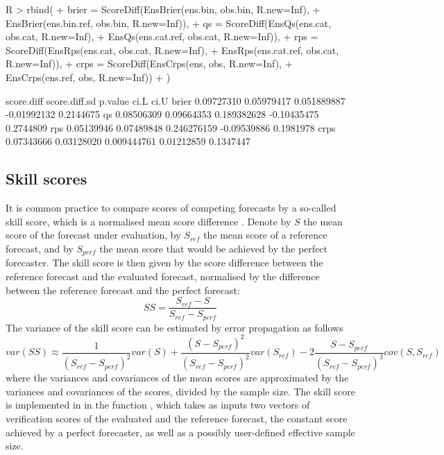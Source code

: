 \documentclass[article]{jss}
\begin{document}
\begin{Schunk}
\begin{Sinput}
R > rbind(
+   brier = ScoreDiff(EnsBrier(ens.bin,     obs.bin, R.new=Inf), 
+                     EnsBrier(ens.bin.ref, obs.bin, R.new=Inf)),
+   qs    = ScoreDiff(EnsQs(ens.cat,     obs.cat, R.new=Inf), 
+                     EnsQs(ens.cat.ref, obs.cat, R.new=Inf)),
+   rps   = ScoreDiff(EnsRps(ens.cat,     obs.cat, R.new=Inf), 
+                     EnsRps(ens.cat.ref, obs.cat, R.new=Inf)),
+   crps  = ScoreDiff(EnsCrps(ens,     obs, R.new=Inf),  
+                     EnsCrps(ens.ref, obs, R.new=Inf))
+ )
\end{Sinput}
\begin{Soutput}
      score.diff score.diff.sd     p.value        ci.L      ci.U
brier 0.09727310    0.05979417 0.051889887 -0.01992132 0.2144675
qs    0.08506309    0.09664353 0.189382628 -0.10435475 0.2744809
rps   0.05139946    0.07489848 0.246276159 -0.09539886 0.1981978
crps  0.07343666    0.03128020 0.009444761  0.01212859 0.1347447
\end{Soutput}
\end{Schunk}


\subsection{Skill scores}

It is common practice to compare scores of competing forecasts by a so-called skill score, which is a normalised mean score difference \citep{wilks2011statistical}.
Denote by $S$ the mean score of the forecast under evaluation, by $S_{ref}$ the mean score of a reference forecast, and by $S_{perf}$ the mean score that would be achieved by the perfect forecaster.
The skill score is then given by the score difference between the reference forecast and the evaluated forecast, normalised by the difference between the reference forecast and the perfect forecast:
%
\begin{equation}
SS = \frac{S_{ref} - S}{S_{ref} - S_{perf}}
\end{equation}
%
The variance of the skill score can be estimated by error propagation as follows
%
\begin{equation}
var(SS) \approx \frac{1}{(S_{ref} - S_{perf})^2} var(S) + \frac{(S - S_{perf})^2}{(S_{ref}-S_{perf})^2} var(S_{ref}) - 2 \frac{S-S_{perf}}{(S_{ref}-S_{perf})^3} cov(S, S_{ref})
\end{equation}
%
where the variances and covariances of the mean scores are approximated by the variances and covariances of the scores, divided by the sample size.
The skill score is implemented in  in the function , which takes as inputs two vectors of verification scores of the evaluated and the reference forecast, the constant score achieved by a perfect forecaster, as well as a possibly user-defined effective sample size.
\end{document}
